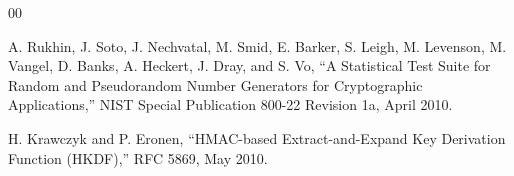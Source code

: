 \documentclass[conference]{IEEEtran}
\begin{document}
\begin{thebibliography}{00}

A. Rukhin, J. Soto, J. Nechvatal, M. Smid, E. Barker, S. Leigh, M. Levenson, M. Vangel, D. Banks, A. Heckert, J. Dray, and S. Vo, ``A Statistical Test Suite for Random and Pseudorandom Number Generators for Cryptographic Applications,'' NIST Special Publication 800-22 Revision 1a, April 2010.

H. Krawczyk and P. Eronen, ``HMAC-based Extract-and-Expand Key Derivation Function (HKDF),'' RFC 5869, May 2010.

\end{thebibliography}
\end{document}
